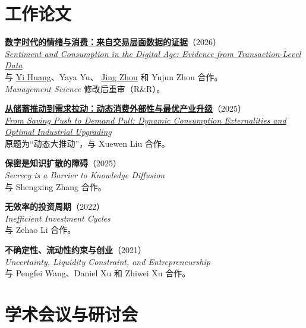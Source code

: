 \documentclass[11pt]{res}
\newcommand{\paperzh}[4]{%
  \textbf{\href{#1}{#2}}（#4）\\[-0.02in]
  {\small\itshape\href{#1}{#3}}%
}
\newcommand{\paperzhplain}[3]{%
  \textbf{#1}（#3）\\[-0.02in]
  {\small\itshape #2}%
}
\newenvironment{cvitem}
  {\par\noindent\hspace{-0.42in}\begin{minipage}{\linewidth}}
  {\end{minipage}\par\vspace{0.05in}}
\begin{document}
\begin{resume}
\section{\bf 工作论文}
\vspace{0.1in}

\begin{cvitem}
\paperzh{https://papers.ssrn.com/sol3/papers.cfm?abstract_id=7259258}
  {数字时代的情绪与消费：来自交易层面数据的证据}
  {Sentiment and Consumption in the Digital Age:
  Evidence from Transaction-Level Data}{2026}\\
与 \href{https://yihuang05.wixsite.com/macro}{Yi Huang}、Yaya Yu、
\href{https://jing-zhou.weebly.com/}{Jing Zhou} 和 Yujun Zhou 合作。\\
\textit{Management Science} 修改后重审（R\&R）。
\end{cvitem}

\begin{cvitem}
\paperzh{https://papers.ssrn.com/sol3/papers.cfm?abstract_id=5601090}
  {从储蓄推动到需求拉动：动态消费外部性与最优产业升级}
  {From Saving Push to Demand Pull:
  Dynamic Consumption Externalities and Optimal Industrial Upgrading}{2025}\\
原题为“动态大推动”，与 Xuewen Liu 合作。
\end{cvitem}

\begin{cvitem}
\paperzhplain
  {保密是知识扩散的障碍}
  {Secrecy is a Barrier to Knowledge Diffusion}{2025}\\
与 Shengxing Zhang 合作。
\end{cvitem}

\begin{cvitem}
\paperzhplain
  {无效率的投资周期}
  {Inefficient Investment Cycles}{2022}\\
与 Zehao Li 合作。
\end{cvitem}

\begin{cvitem}
\paperzhplain
  {不确定性、流动性约束与创业}
  {Uncertainty, Liquidity Constraint, and Entrepreneurship}{2021}\\
与 Pengfei Wang、Daniel Xu 和 Zhiwei Xu 合作。
\end{cvitem}

\section{\bf 学术会议与研讨会}
\vspace{0.1in}


\end{resume}
\end{document}
